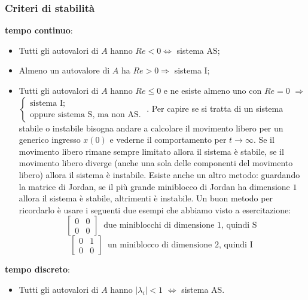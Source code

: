 \begin{landscape}
\begin{multicols*}{3}
    \subsubsection*{Criteri di stabilità}
    \textbf{tempo continuo}:
    \begin{itemize}
        \item Tutti gli autovalori di $A$ hanno $Re < 0 \Longleftrightarrow $ sistema AS;
        \item Almeno un autovalore di $A$ ha $Re > 0 \Longrightarrow$ sistema I;
        \item Tutti gli autovalori di $A$ hanno $Re \leq 0$ e ne esiste almeno uno con $Re = 0$ $\Longrightarrow$ $\begin{cases}
            \text{sistema I;}\;\\
            \text{oppure sistema S, ma non AS.}\;
        \end{cases}$. \newline
        Per capire se si tratta di un sistema stabile o instabile bisogna andare a calcolare il movimento libero per un generico ingresso $x(0)$ e vederne il comportamento per $t \rightarrow \infty$. Se il movimento libero rimane sempre limitato allora il sistema è stabile, se il movimento libero diverge (anche una sola delle componenti del movimento libero) allora il sistema è instabile. \newline
        Esiste anche un altro metodo: guardando la matrice di Jordan, se il più grande miniblocco di Jordan ha dimensione $1$ allora il sistema è stabile, altrimenti è instabile. Un buon metodo per ricordarlo è usare i seguenti due esempi che abbiamo visto a esercitazione:
        \[
            \left[\begin{matrix}
                0 & 0 \\
                0 & 0
            \end{matrix}\right] \;\;\text{due miniblocchi di dimensione 1, quindi S}\;
        \]
        \[
            \left[\begin{matrix}
                0&1\\
                0&0
            \end{matrix}\right] \;\; \text{un miniblocco di dimensione 2, quindi I}\;
        \]
    \end{itemize}
    \textbf{tempo discreto}:
    \begin{itemize}
        \item Tutti gli autovalori di $A$ hanno $|\lambda_i| < 1$ $\Longleftrightarrow$ sistema AS.

\end{itemize}
\end{multicols*}
\end{landscape}
